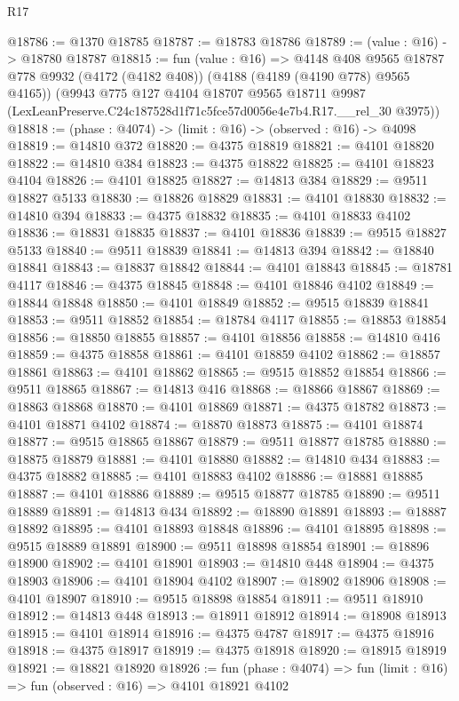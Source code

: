 \begin{lexlean}{R17}
\begin{coremodule}
@18786 := @1370 @18785
@18787 := @18783 @18786
@18789 := (value : @16) -> @18780 @18787
@18815 := fun (value : @16) =>
  @4148
    @408
    @9565
    @18787
    @778
    @9932
    (@4172 (@4182 @408))
    (@4188 (@4189 (@4190 @778) @9565 @4165))
    (@9943
      @775
      @127
      @4104
      @18707
      @9565
      @18711
      @9987
      (LexLeanPreserve.C24c187528d1f71c5fce57d0056e4e7b4.R17.__rel_30 @3975))
@18818 := (phase : @4074) -> (limit : @16) -> (observed : @16) -> @4098
@18819 := @14810 @372
@18820 := @4375 @18819
@18821 := @4101 @18820
@18822 := @14810 @384
@18823 := @4375 @18822
@18825 := @4101 @18823 @4104
@18826 := @4101 @18825
@18827 := @14813 @384
@18829 := @9511 @18827 @5133
@18830 := @18826 @18829
@18831 := @4101 @18830
@18832 := @14810 @394
@18833 := @4375 @18832
@18835 := @4101 @18833 @4102
@18836 := @18831 @18835
@18837 := @4101 @18836
@18839 := @9515 @18827 @5133
@18840 := @9511 @18839
@18841 := @14813 @394
@18842 := @18840 @18841
@18843 := @18837 @18842
@18844 := @4101 @18843
@18845 := @18781 @4117
@18846 := @4375 @18845
@18848 := @4101 @18846 @4102
@18849 := @18844 @18848
@18850 := @4101 @18849
@18852 := @9515 @18839 @18841
@18853 := @9511 @18852
@18854 := @18784 @4117
@18855 := @18853 @18854
@18856 := @18850 @18855
@18857 := @4101 @18856
@18858 := @14810 @416
@18859 := @4375 @18858
@18861 := @4101 @18859 @4102
@18862 := @18857 @18861
@18863 := @4101 @18862
@18865 := @9515 @18852 @18854
@18866 := @9511 @18865
@18867 := @14813 @416
@18868 := @18866 @18867
@18869 := @18863 @18868
@18870 := @4101 @18869
@18871 := @4375 @18782
@18873 := @4101 @18871 @4102
@18874 := @18870 @18873
@18875 := @4101 @18874
@18877 := @9515 @18865 @18867
@18879 := @9511 @18877 @18785
@18880 := @18875 @18879
@18881 := @4101 @18880
@18882 := @14810 @434
@18883 := @4375 @18882
@18885 := @4101 @18883 @4102
@18886 := @18881 @18885
@18887 := @4101 @18886
@18889 := @9515 @18877 @18785
@18890 := @9511 @18889
@18891 := @14813 @434
@18892 := @18890 @18891
@18893 := @18887 @18892
@18895 := @4101 @18893 @18848
@18896 := @4101 @18895
@18898 := @9515 @18889 @18891
@18900 := @9511 @18898 @18854
@18901 := @18896 @18900
@18902 := @4101 @18901
@18903 := @14810 @448
@18904 := @4375 @18903
@18906 := @4101 @18904 @4102
@18907 := @18902 @18906
@18908 := @4101 @18907
@18910 := @9515 @18898 @18854
@18911 := @9511 @18910
@18912 := @14813 @448
@18913 := @18911 @18912
@18914 := @18908 @18913
@18915 := @4101 @18914
@18916 := @4375 @4787
@18917 := @4375 @18916
@18918 := @4375 @18917
@18919 := @4375 @18918
@18920 := @18915 @18919
@18921 := @18821 @18920
@18926 := fun (phase : @4074) => fun (limit : @16) => fun (observed : @16) => @4101 @18921 @4102

\end{coremodule}
\end{lexlean}
